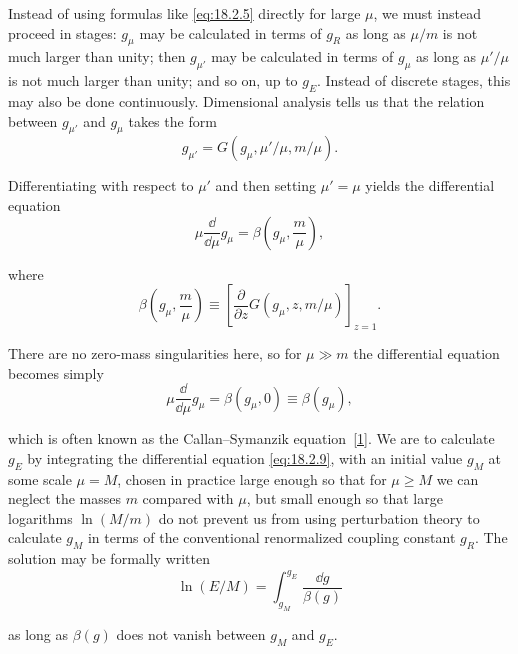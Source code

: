 Instead of using formulas like \eqref{eq:18.2.5} directly for large $\mu$, we
must instead proceed in stages: $g_\mu$ may be calculated in terms of $g_R$
as long as $\mu/m$ is not much larger than unity; then $g_{\mu'}$ may be
calculated in terms of $g_\mu$ as long as $\mu'/\mu$ is not much larger than
unity; and so on, up to $g_E$. Instead of discrete stages, this may also be
done continuously. Dimensional analysis tells us that the relation between
$g_{\mu'}$ and $g_\mu$ takes the form
\begin{equation}
g_{\mu'}=G(g_\mu,\mu'/\mu,m/\mu).
\tag{18.2.6}\label{eq:18.2.6}
\end{equation}
\par\noindent
Differentiating with respect to $\mu'$ and then setting $\mu'=\mu$ yields the
differential equation
\begin{equation}
\mu\frac{\dd}{\dd\mu}g_\mu=\beta\left(g_\mu,\frac{m}{\mu}\right),
\tag{18.2.7}\label{eq:18.2.7}
\end{equation}
\par\noindent
where
\begin{equation}
\beta\left(g_\mu,\frac{m}{\mu}\right)
\equiv\left[\frac{\partial}{\partial z}G(g_\mu,z,m/\mu)\right]_{z=1}.
\tag{18.2.8}\label{eq:18.2.8}
\end{equation}
\par\noindent
There are no zero-mass singularities here, so for $\mu\gg m$ the differential
equation becomes simply
\begin{equation}
\mu\frac{\dd}{\dd\mu}g_\mu=\beta(g_\mu,0)\equiv\beta(g_\mu),
\tag{18.2.9}\label{eq:18.2.9}
\end{equation}
\par\noindent
which is often known as the Callan--Symanzik equation~\hyperref[ch18-ref-1]{[1]}.
We are to calculate $g_E$ by integrating the differential equation
\eqref{eq:18.2.9}, with an initial value $g_M$ at some scale $\mu=M$, chosen
in practice large enough so that for $\mu\geq M$ we can neglect the masses
$m$ compared with $\mu$, but small enough so that large logarithms
$\ln(M/m)$ do not prevent us from using perturbation theory to calculate
$g_M$ in terms of the conventional renormalized coupling constant $g_R$. The
solution may be formally written
\begin{equation}
\ln(E/M)=\int_{g_M}^{g_E}\frac{\dd g}{\beta(g)}
\tag{18.2.10}\label{eq:18.2.10}
\end{equation}
\par\noindent
as long as $\beta(g)$ does not vanish between $g_M$ and $g_E$.

